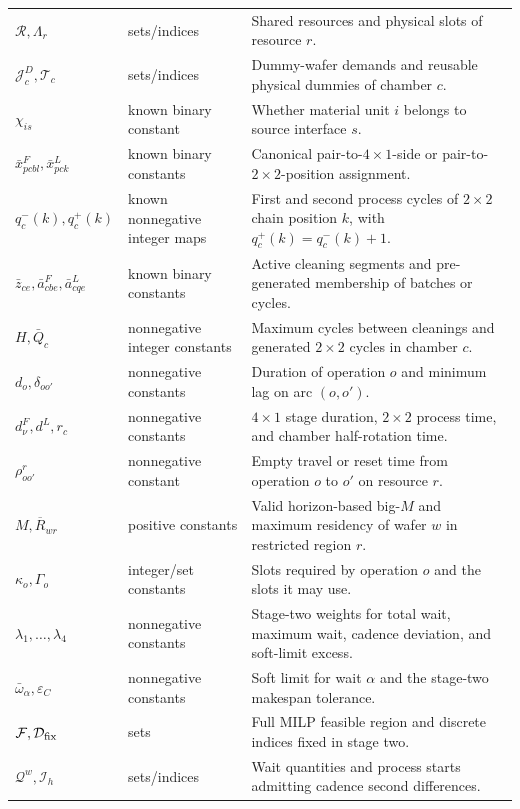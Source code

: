 \documentclass[journal]{IEEEtran}
\begin{document}
\begin{table}[t]
\begin{tabular}{C{0.20\textwidth}C{0.20\textwidth}C{0.55\textwidth}}
$\mathcal R,\Lambda_r$ & sets/indices & Shared resources and physical slots of resource $r$.\\
$\mathcal J_c^D,\mathcal T_c$ & sets/indices & Dummy-wafer demands and reusable physical dummies of chamber $c$.\\
$\chi_{is}$ & known binary constant & Whether material unit $i$ belongs to source interface $s$.\\
$\bar x^F_{pcbl},\bar x^L_{pck}$ & known binary constants & Canonical pair-to-$4\times1$-side or pair-to-$2\times2$-position assignment.\\
$q_c^-(k),q_c^+(k)$ & known nonnegative integer maps & First and second process cycles of $2\times2$ chain position $k$, with $q_c^+(k)=q_c^-(k)+1$.\\
$\bar z_{ce},\bar a^F_{cbe},\bar a^L_{cqe}$ & known binary constants & Active cleaning segments and pre-generated membership of batches or cycles.\\
$H,\bar Q_c$ & nonnegative integer constants & Maximum cycles between cleanings and generated $2\times2$ cycles in chamber $c$.\\
$d_o,\delta_{oo'}$ & nonnegative constants & Duration of operation $o$ and minimum lag on arc $(o,o')$.\\
$d^F_\nu,d^L,r_c$ & nonnegative constants & $4\times1$ stage duration, $2\times2$ process time, and chamber half-rotation time.\\
$\rho^r_{oo'}$ & nonnegative constant & Empty travel or reset time from operation $o$ to $o'$ on resource $r$.\\
$M,\overline R_{wr}$ & positive constants & Valid horizon-based big-$M$ and maximum residency of wafer $w$ in restricted region $r$.\\
$\kappa_o,\Gamma_o$ & integer/set constants & Slots required by operation $o$ and the slots it may use.\\
$\lambda_1,\ldots,\lambda_4$ & nonnegative constants & Stage-two weights for total wait, maximum wait, cadence deviation, and soft-limit excess.\\
$\bar\omega_\alpha,\varepsilon_C$ & nonnegative constants & Soft limit for wait $\alpha$ and the stage-two makespan tolerance.\\
$\mathcal F,\mathcal D_{\rm fix}$ & sets & Full MILP feasible region and discrete indices fixed in stage two.\\
$\mathcal Q^w,\mathcal I_h$ & sets/indices & Wait quantities and process starts admitting cadence second differences.\\
\bottomrule
\end{tabular}
\end{table}
\end{document}
